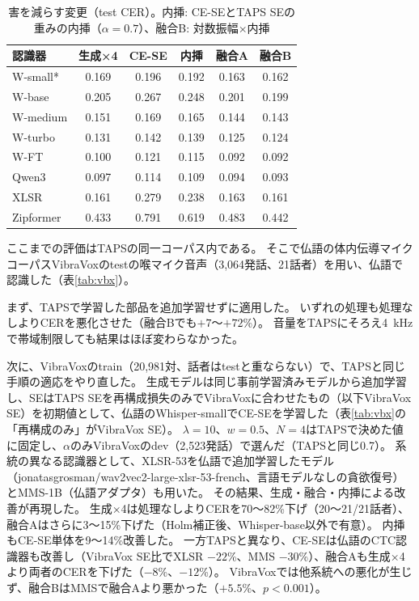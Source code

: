 \documentclass[xelatex,ja=standard,a4paper,twocolumn,10pt]{bxjsarticle}
\makeatletter
\renewcommand{\subsection}{\@startsection{subsection}{2}{\z@}{.7ex plus .2ex}{.3ex}{\normalfont\normalsize\sffamily\bfseries}}
\makeatother
\begin{document}
\begin{table}[t]
  \centering
  \caption{害を減らす変更（test CER）。内挿: CE-SEとTAPS SEの重みの内挿（$\alpha=0.7$）、融合B: 対数振幅×内挿}
  \label{tab:wise}
  \small
  \setlength{\tabcolsep}{3pt}
  \begin{tabular}{lccccc}
    \toprule
    認識器 & 生成×4 & CE-SE & 内挿 & 融合A & 融合B \\
    \midrule
    W-small* & 0.169 & 0.196 & 0.192 & 0.163 & 0.162 \\
    W-base & 0.205 & 0.267 & 0.248 & 0.201 & 0.199 \\
    W-medium & 0.151 & 0.169 & 0.165 & 0.144 & 0.143 \\
    W-turbo & 0.131 & 0.142 & 0.139 & 0.125 & 0.124 \\
    W-FT & 0.100 & 0.121 & 0.115 & 0.092 & 0.092 \\
    Qwen3 & 0.097 & 0.114 & 0.109 & 0.094 & 0.093 \\
    \midrule
    XLSR & 0.161 & 0.279 & 0.238 & 0.163 & 0.161 \\
    Zipformer & 0.433 & 0.791 & 0.619 & 0.483 & 0.442 \\
    \bottomrule
  \end{tabular}
\end{table}

\subsection{別データセットでの評価}
ここまでの評価はTAPSの同一コーパス内である。
そこで仏語の体内伝導マイクコーパスVibraVox\cite{vibravox}のtestの喉マイク音声（3,064発話、21話者）を用い、仏語で認識した（表\ref{tab:vbx}）。

まず、TAPSで学習した部品を追加学習せずに適用した。
いずれの処理も処理なしよりCERを悪化させた（融合Bでも$+7$〜$+72$\%）。
音量をTAPSにそろえ4~kHzで帯域制限しても結果はほぼ変わらなかった。

次に、VibraVoxのtrain（20,981対、話者はtestと重ならない）で、TAPSと同じ手順の適応をやり直した。
生成モデルは同じ事前学習済みモデルから追加学習し、SEはTAPS SEを再構成損失のみでVibraVoxに合わせたもの（以下VibraVox SE）を初期値として、仏語のWhisper-smallでCE-SEを学習した（表\ref{tab:vbx}の「再構成のみ」がVibraVox SE）。
$\lambda=10$、$w=0.5$、$N=4$はTAPSで決めた値に固定し、$\alpha$のみVibraVoxのdev（2,523発話）で選んだ（TAPSと同じ0.7）。
系統の異なる認識器として、XLSR-53\cite{xlsr}を仏語で追加学習したモデル（jonatasgrosman/wav2vec2-large-xlsr-53-french、言語モデルなしの貪欲復号）とMMS-1B（仏語アダプタ）も用いた。
その結果、生成・融合・内挿による改善が再現した。
生成×4は処理なしよりCERを70〜82\%下げ（20〜21/21話者）、融合Aはさらに3〜15\%下げた（Holm補正後、Whisper-base以外で有意）。
内挿もCE-SE単体を9〜14\%改善した。
一方TAPSと異なり、CE-SEは仏語のCTC認識器も改善し（VibraVox SE比でXLSR $-22$\%、MMS $-30$\%）、融合Aも生成×4より両者のCERを下げた（$-8$\%、$-12$\%）。
VibraVoxでは他系統への悪化が生じず、融合BはMMSで融合Aより悪かった（$+5.5$\%、$p<0.001$）。
\end{document}
